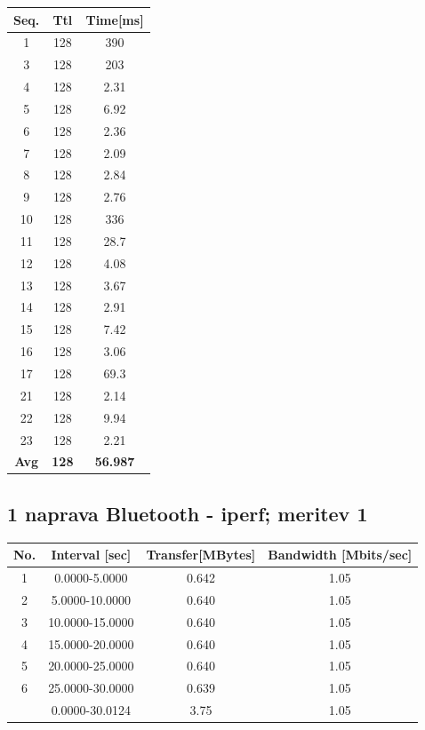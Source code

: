 \documentclass[11pt,a4paper,slovene]{article}
\begin{document}
 
\begin{table}[H]
	\begin{adjustwidth}{-3cm}{-3cm}
	\centering
		\begin{tabular}{c|c|c}
		\hline
		\textbf{Seq.} & \textbf{Ttl} & \textbf{Time[ms]}\\
     		\hline
     		1 & 128 & 390\\
  		3 & 128 & 203\\
  		4 & 128 & 2.31\\
  		5 & 128 & 6.92\\
  		6 & 128 & 2.36\\
  		7 & 128 & 2.09\\
  		8 & 128 & 2.84\\
  		9 & 128 & 2.76\\
  		10 & 128 & 336\\
  		11 & 128 & 28.7\\
  		12 & 128 & 4.08\\
  		13 & 128 & 3.67\\
  		14 & 128 & 2.91\\
  		15 & 128 & 7.42\\
  		16 & 128 & 3.06\\
  		17 & 128 & 69.3\\
  		21 & 128 & 2.14\\
  		22 & 128 & 9.94\\
  		23 & 128 & 2.21\\
  		\hline
  		\textbf{Avg} & \textbf{128} & \textbf{56.987}\\
  		\hline
  		\end{tabular}
    	\end{adjustwidth}
\end{table}

\subsection{1 naprava Bluetooth - iperf; meritev 1}

\begin{table}[H]
	\begin{adjustwidth}{-3cm}{-3cm}
	\centering
		\begin{tabular}{c|c|c|c}
		\hline
		\textbf{No.} & \textbf{Interval [sec]} & \textbf{Transfer[MBytes]} & \textbf{Bandwidth [Mbits/sec]}\\
     		\hline
     		1 & 0.0000-5.0000 & 0.642 & 1.05\\
  		2 & 5.0000-10.0000 & 0.640 & 1.05\\
  		3 & 10.0000-15.0000 & 0.640 & 1.05\\
  		4 & 15.0000-20.0000 & 0.640 & 1.05\\
  		5 & 20.0000-25.0000 & 0.640 & 1.05\\
  		6 & 25.0000-30.0000 & 0.639 & 1.05\\
  		\hline
  		& 0.0000-30.0124 & 3.75 & 1.05\\
  		\hline
    		\end{tabular}
    	\end{adjustwidth}
\end{table}
\end{document}
